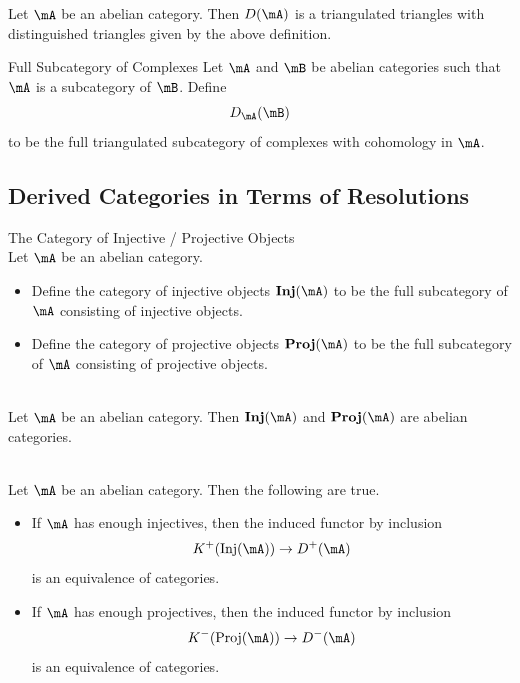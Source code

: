 \documentclass[a4paper]{article}
\begin{document}
\begin{thm}{}{} Let $\mA$ be an abelian category. Then $D(\mA)$ is a triangulated triangles with distinguished triangles given by the above definition. 
\end{thm}

\begin{defn}{Full Subcategory of Complexes}{} Let $\mA$ and $\mB$ be abelian categories such that $\mA$ is a subcategory of $\mB$. Define $$D_\mA(\mB)$$ to be the full triangulated subcategory of complexes with cohomology in $\mA$. 
\end{defn}

\subsection{Derived Categories in Terms of Resolutions}
\begin{defn}{The Category of Injective / Projective Objects}{}\\
Let $\mA$ be an abelian category. 
\begin{itemize}
\item Define the category of injective objects $\bold{Inj}(\mA)$ to be the full subcategory of $\mA$ consisting of injective objects. 
\item Define the category of projective objects $\bold{Proj}(\mA)$ to be the full subcategory of $\mA$ consisting of projective objects. 
\end{itemize}
\end{defn}

\begin{lmm}{}{}\\
Let $\mA$ be an abelian category. Then $\bold{Inj}(\mA)$ and $\bold{Proj}(\mA)$ are abelian categories. 
\end{lmm}

\begin{prp}{}{}\\
Let $\mA$ be an abelian category. Then the following are true. 
\begin{itemize}
\item If $\mA$ has enough injectives, then the induced functor by inclusion $$K^+(\text{Inj}(\mA))\to D^+(\mA)$$ is an equivalence of categories. 
\item If $\mA$ has enough projectives, then the induced functor by inclusion $$K^-(\text{Proj}(\mA))\to D^-(\mA)$$ is an equivalence of categories. 
\end{itemize}
\end{prp}
\end{document}
